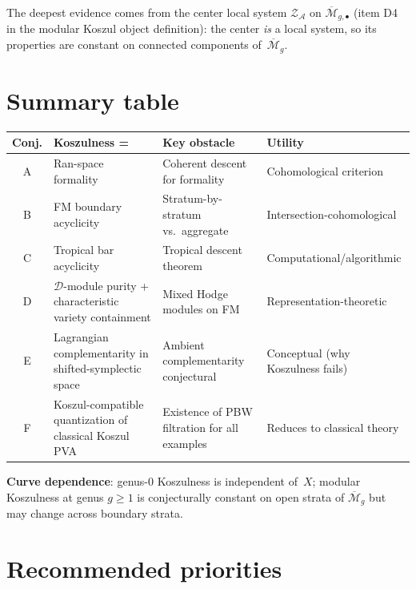 \documentclass[11pt]{article}
\newcommand{\cA}{\mathcal{A}}
\newcommand{\cD}{\mathcal{D}}
\newcommand{\cZ}{\mathcal{Z}}
\theoremstyle{plain}
\theoremstyle{definition}
\theoremstyle{remark}
\begin{document}
The deepest evidence comes from the center local system
$\cZ_\cA$ on $\overline{\mathcal{M}}_{g,\bullet}$ (item D4
in the modular Koszul object definition): the center \emph{is}
a local system, so its properties are constant on connected
components of~$\overline{\mathcal{M}}_g$.


\section{Summary table}
\label{sec:summary}

\begin{center}
\renewcommand{\arraystretch}{1.4}
\begin{tabular}{|c|p{3.8cm}|p{3.8cm}|p{3.8cm}|}
\hline
\textbf{Conj.} & \textbf{Koszulness =} & \textbf{Key obstacle} & \textbf{Utility} \\
\hline
A & Ran-space formality & Coherent descent for formality & Cohomological criterion \\
\hline
B & FM boundary acyclicity & Stratum-by-stratum vs.\ aggregate & Intersection-cohomological \\
\hline
C & Tropical bar acyclicity & Tropical descent theorem & Computational/algorithmic \\
\hline
D & $\cD$-module purity + characteristic variety containment & Mixed Hodge modules on FM & Representation-theoretic \\
\hline
E & Lagrangian complementarity in shifted-symplectic space & Ambient complementarity conjectural & Conceptual (why Koszulness fails) \\
\hline
F & Koszul-compatible quantization of classical Koszul PVA & Existence of PBW filtration for all examples & Reduces to classical theory \\
\hline
\end{tabular}
\end{center}

\medskip
\noindent\textbf{Curve dependence}: genus-$0$ Koszulness is
independent of~$X$; modular Koszulness at genus $g \geq 1$ is
conjecturally constant on open strata of $\overline{\mathcal{M}}_g$
but may change across boundary strata.


\section{Recommended priorities}
\label{sec:priorities}
\end{document}
